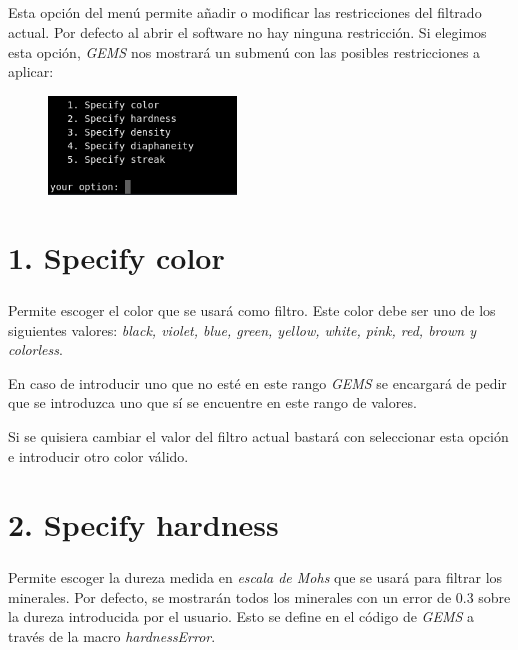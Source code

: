 \documentclass[a4paper,10pt]{article}
\begin{document}
\paragraph{}Esta opción del menú permite añadir o modificar las restricciones del filtrado actual. Por defecto al abrir el software no hay ninguna restricción. Si elegimos esta opción, \textit{GEMS} nos mostrará un submenú con las posibles restricciones a aplicar:
\begin{figure}[ht]
  \centering
  \includegraphics[width=50mm]{./figures/Figure2.png}
\end{figure}

\chapter{1. Specify color}
\setlength{\parskip}{0.5em}
\paragraph{}Permite escoger el color que se usará como filtro. Este color debe ser uno de los siguientes valores: \textit{black, violet, blue, green, yellow, white, pink, red, brown y colorless}.

En caso de introducir uno que no esté en este rango \textit{GEMS} se encargará de pedir que se introduzca uno que sí se encuentre en este rango de valores.

Si se quisiera cambiar el valor del filtro actual bastará con seleccionar esta opción e introducir otro color válido.
\setlength{\parskip}{1em}\\

\chapter{2. Specify hardness}
\setlength{\parskip}{0.5em}
\paragraph{}Permite escoger la dureza medida en \textit{escala de Mohs} que se usará para filtrar los minerales. Por defecto, se mostrarán todos los minerales con un error de 0.3 sobre la dureza introducida por el usuario. Esto se define en el código de \textit{GEMS} a través de la macro \textit{hardnessError}.
\end{document}
